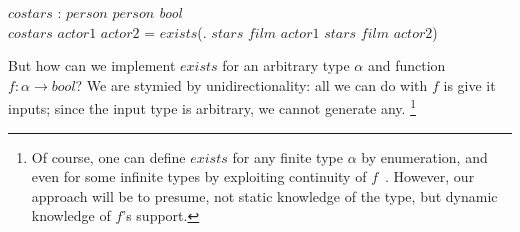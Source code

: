 \documentclass[runningheads]{llncs}
\makeatletter
\newlength{\negph@wd}
\DeclareRobustCommand{\negphantom}[1]{%
  \ifmmode
    \mathpalette\negph@math{#1}%
  \else
    \negph@do{#1}%
  \fi
}
\newcommand{\negph@math}[2]{\negph@do{$\m@th#1#2$}}
\newcommand{\negph@do}[1]{%
  \settowidth{\negph@wd}{#1}%
  \hspace*{-\negph@wd}%
}\makeatother
\newcommand\name[1]{\ensuremath{\mathit{#1}}}
\newcommand\<\:                 %
\newcommand\fnspace{\<}         %
\newcommand\fn[1]{\lambda{#1}.\fnspace}
\newcommand\typename\textit
\newcommand\bool{\typename{bool}}
\newcommand\kword[1]{\ensuremath{\textrm{#1}}}
\newcommand\false{\name{false}}
\newcommand\tand{\mathrel{\kword{and}}}
\makeatother
\begin{document}
\begin{code}
\name{costars} : \name{person} \to \name{person} \to \bool\\



\name{costars} \<\name{actor1} \<\name{actor2} =
\name{exists}\<(\fn{\name{film}}
\name{stars} \<\name{film} \<\name{actor1}
\tand
\name{stars} \<\name{film} \<\name{actor2})
\end{code}

\noindent
But how can we implement \name{exists} for an arbitrary type $\alpha$ and function $f : \alpha \to \bool$?
We are stymied by unidirectionality: all we can do with $f$ is give it inputs; since the input type is arbitrary, we cannot generate any.%
\footnote{%
  Of course, one can define \name{exists} for any finite type $\alpha$ by enumeration, and
  even for some infinite types by exploiting continuity of $f$~\cite{seemingly-impossible-functional-programs,DBLP:conf/lics/Escardo07}.
  However, our approach will be to presume, not static knowledge of the type, but dynamic knowledge of $f$'s support.
}
\end{document}

